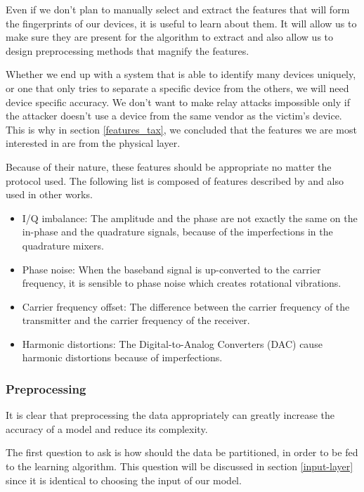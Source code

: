 Even if we don't plan to manually select and extract the features that will form the fingerprints of our devices, it is useful to learn about them. It will allow us to make sure they are present for the algorithm to extract and also allow us to design preprocessing methods that magnify the features.

Whether we end up with a system that is able to identify many devices uniquely, or one that only tries to separate a specific device from the others, we will need device specific accuracy. We don't want to make relay attacks impossible only if the attacker doesn't use a device from the same vendor as the victim's device. This is why in section \ref{features_tax}, we concluded that the features we are most interested in are from the physical layer.

Because of their nature, these features should be appropriate no matter the protocol used. The following list is composed of features described by \textcite{riyaz_deep_2018} and also used in other works.

\begin{itemize}
  \item{I/Q imbalance:} The amplitude and the phase are not exactly the same on the in-phase and the quadrature signals, because of the imperfections in the quadrature mixers.
  \item{Phase noise:} When the baseband signal is up-converted to the carrier frequency, it is sensible to phase noise which creates rotational vibrations.
  \item{Carrier frequency offset:} The difference between the carrier frequency of the transmitter and the carrier frequency of the receiver.
  \item{Harmonic distortions:} The Digital-to-Analog Converters (DAC) cause harmonic distortions because of imperfections.
\end{itemize}

\subsubsection{Preprocessing}

It is clear that preprocessing the data appropriately can greatly increase the accuracy of a model and reduce its complexity.

The first question to ask is how should the data be partitioned, in order to be fed to the learning algorithm. This question will be discussed in section \ref{input-layer} since it is identical to choosing the input of our model.

